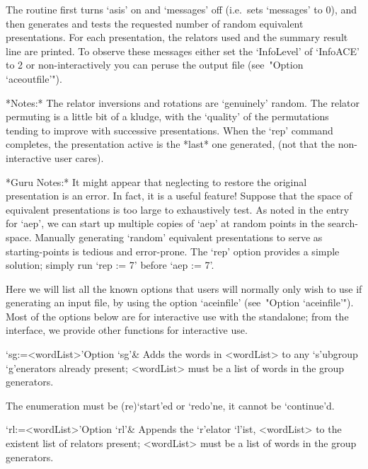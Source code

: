 The routine first  turns  `asis'  on  and  `messages'  off  (i.e.~sets
`messages' to 0), and then generates and tests the requested number of
random equivalent presentations. For each presentation,  the  relators
used and the  summary  result  line  are  printed.  To  observe  these
messages  either  set  the  `InfoLevel'   of   `InfoACE'   to   2   or
non-interactively you can peruse the {\ACE} output  file  (see~"Option
`aceoutfile'").

*Notes:*
The relator inversions and rotations are \lq{}genuinely'  random.  The
relator permuting is a little bit of a kludge, with the  \lq{}quality'
of the permutations tending to improve with successive  presentations.
When the `rep' command  completes,  the  presentation  active  is  the
*last* one generated, (not that the non-interactive user cares).

*Guru Notes:*
It might appear that neglecting to restore the  original  presentation
is an error. In fact, it is a useful feature! Suppose that  the  space
of equivalent presentations is too  large  to  exhaustively  test.  As
noted in the entry for `aep', we can start up multiple copies of `aep'
at random points in the  search-space.  Manually  generating  `random'
equivalent presentations to serve as starting-points  is  tedious  and
error-prone. The `rep' option provides a simple solution;  simply  run
`rep := 7' before `aep := 7'.

\enditems


Here we will list  all  the  known  {\ACE}  options  that  users  will
normally only wish to use if generating an input file,  by  using  the
option `aceinfile' (see~"Option  `aceinfile'").  Most of  the  options
below are for interactive use with the  standalone;  from  the  {\GAP}
interface, we provide other functions for interactive use.

\beginitems

\>`sg:=<wordList>'{Option `sg'}&
Adds the words in <wordList> to any  `s'ubgroup  `g'enerators  already
present; <wordList> must be a list of words in the group generators.

The enumeration must  be  (re)`start'ed  or  `redo'ne,  it  cannot  be
`continue'd.

\>`rl:=<wordList>'{Option `rl'}&
Appends the `r'elator `l'ist,  <wordList>  to  the  existent  list  of
relators present; <wordList> must be a list  of  words  in  the  group
generators.

